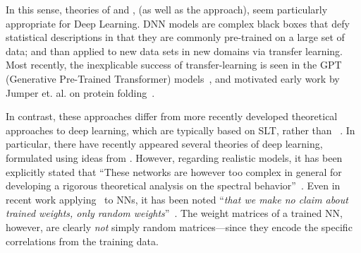  In this sense, \SemiEmpirical theories of \NuclearPhysics and \QuantumChemistry,
 (as well as the \RenormalizationGroup approach),  seem particularly appropriate
  for Deep Learning.
  DNN models are complex black boxes that defy statistical descriptions in that
  they are commonly pre-trained on a large set of data; and than applied to new data sets in new domains via transfer learning.
  Most recently, the inexplicable success of transfer-learning is seen
in the GPT (Generative Pre-Trained Transformer) models~\cite{Radford2018},
and motivated early work by Jumper et. al. on protein folding~\cite{JKS16_TR}.

In contrast, these \SemiEmpirical approaches differ from more
recently developed theoretical approaches to deep learning, which are typically based on SLT, rather than \STATMECH~\cite{Roberts2021}.
In particular, there have recently appeared several theories of deep learning, formulated using ideas from \RMT.
However, regarding realistic models, it has been explicitly stated that
``These networks are however too complex in general for developing a rigorous theoretical analysis on the spectral behavior''~\cite{LBNx17_TR}.
Even in recent work applying \RMT~to NNs, it has been noted
``\emph{that we make no claim about trained weights, only random weights}''~\cite{Yang2021}.
The weight matrices of a trained NN, however, are clearly \emph{not} simply random matrices---since they encode the specific correlations from the training data.


%
